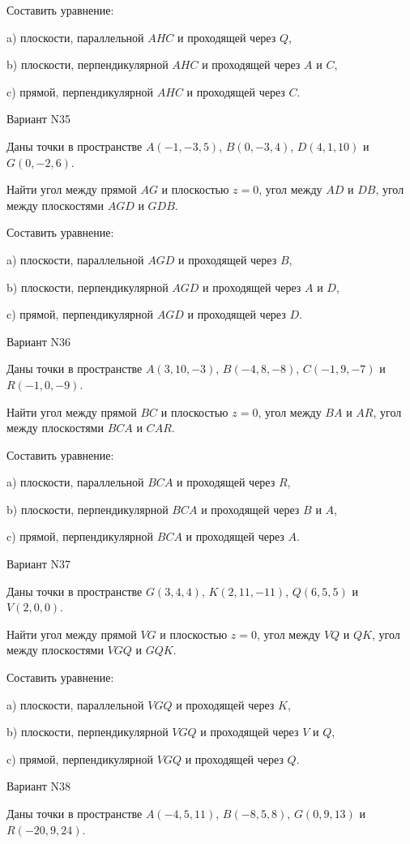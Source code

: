 \documentclass[11pt]{report}
\begin{document}
Составить уравнение: 

a) плоскости, параллельной $AHC$ и проходящей через $Q$,

b) плоскости, перпендикулярной $AHC$ и проходящей через $A$ и $C$,

c) прямой, перпендикулярной $AHC$ и проходящей через $C$.

Вариант N35

Даны точки в пространстве
$A(-1, -3, 5)$, $B(0, -3, 4)$, $D(4, 1, 10)$ и
$G(0, -2, 6)$.

Найти угол между прямой $AG$ и плоскостью $z = 0$, угол между $AD$ и $DB$, угол между плоскостями $AGD$ 
и $GDB$.

Составить уравнение: 

a) плоскости, параллельной $AGD$ и проходящей через $B$,

b) плоскости, перпендикулярной $AGD$ и проходящей через $A$ и $D$,

c) прямой, перпендикулярной $AGD$ и проходящей через $D$.

Вариант N36

Даны точки в пространстве
$A(3, 10, -3)$, $B(-4, 8, -8)$, $C(-1, 9, -7)$ и
$R(-1, 0, -9)$.

Найти угол между прямой $BC$ и плоскостью $z = 0$, угол между $BA$ и $AR$, угол между плоскостями $BCA$ 
и $CAR$.

Составить уравнение: 

a) плоскости, параллельной $BCA$ и проходящей через $R$,

b) плоскости, перпендикулярной $BCA$ и проходящей через $B$ и $A$,

c) прямой, перпендикулярной $BCA$ и проходящей через $A$.

Вариант N37

Даны точки в пространстве
$G(3, 4, 4)$, $K(2, 11, -11)$, $Q(6, 5, 5)$ и
$V(2, 0, 0)$.

Найти угол между прямой $VG$ и плоскостью $z = 0$, угол между $VQ$ и $QK$, угол между плоскостями $VGQ$ 
и $GQK$.

Составить уравнение: 

a) плоскости, параллельной $VGQ$ и проходящей через $K$,

b) плоскости, перпендикулярной $VGQ$ и проходящей через $V$ и $Q$,

c) прямой, перпендикулярной $VGQ$ и проходящей через $Q$.

Вариант N38

Даны точки в пространстве
$A(-4, 5, 11)$, $B(-8, 5, 8)$, $G(0, 9, 13)$ и
$R(-20, 9, 24)$.
\end{document}
